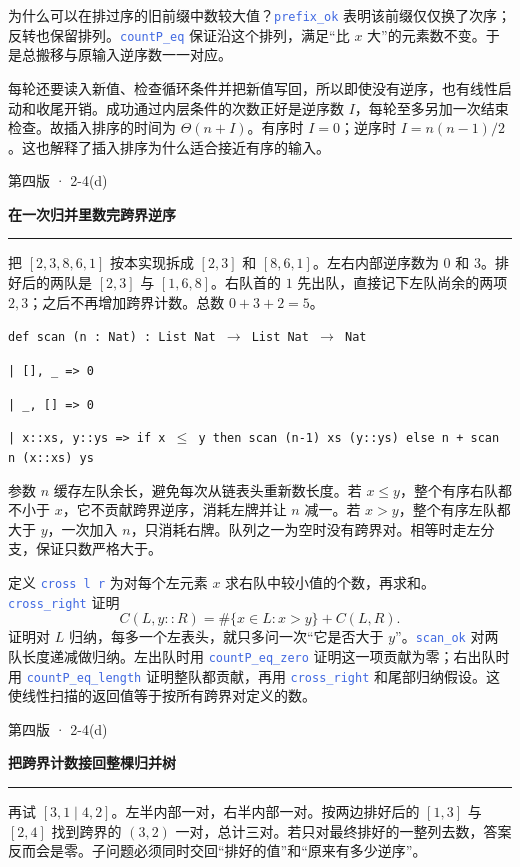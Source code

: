 \documentclass[UTF8,11pt,a4paper,fontset=fandol]{ctexart}
\newcommand{\HandoutLesson}[2]{%
  \par{\small\heiti\color{BrickRed}#1}\par\vspace{3pt}
  {\fontsize{21}{27}\selectfont\heiti\bfseries #2}\par
  \textcolor{BrickRed}{\rule{\linewidth}{.7pt}}\par}
\newcommand{\src}[1]{\textcolor{RoyalBlue}{\texttt{#1}}}
\newcommand{\subhead}[1]{\par\vspace{3pt}{\heiti\bfseries\color{RoyalBlue}#1}\par}
\newenvironment{leanblock}{\par\smallskip\noindent\begin{lrbox}{\leanbox}\begin{minipage}{\dimexpr\linewidth-12pt\relax}\raggedright\small\setlength{\parskip}{0pt}}{\end{minipage}\end{lrbox}\colorbox{RoyalBlue!6}{\usebox{\leanbox}}\par\smallskip}
\newcommand{\lineofcode}[2]{\noindent\hspace*{#1em}\strut\texttt{#2}\par}
\begin{document}
为什么可以在排过序的旧前缀中数较大值？\src{prefix\_ok} 表明该前缀仅仅换了次序；反转也保留排列。\src{countP\_eq} 保证沿这个排列，满足“比 $x$ 大”的元素数不变。于是总搬移与原输入逆序数一一对应。
\subhead{从精确搬移数得到运行时间}
每轮还要读入新值、检查循环条件并把新值写回，所以即使没有逆序，也有线性启动和收尾开销。成功通过内层条件的次数正好是逆序数 $I$，每轮至多另加一次结束检查。故插入排序的时间为 $\Theta(n+I)$。有序时 $I=0$；逆序时 $I=n(n-1)/2$。这也解释了插入排序为什么适合接近有序的输入。
\par{}
\clearpage{}\label{p49}\HandoutLesson{第四版 · 2-4(d)}{在一次归并里数完跨界逆序}
把 $[2,3,8,6,1]$ 按本实现拆成 $[2,3]$ 和 $[8,6,1]$。左右内部逆序数为 $0$ 和 $3$。排好后的两队是 $[2,3]$ 与 $[1,6,8]$。右队首的 $1$ 先出队，直接记下左队尚余的两项 $2,3$；之后不再增加跨界计数。总数 $0+3+2=5$。
\begin{leanblock}
\lineofcode{0.0}{def scan (n : Nat) : List Nat \ensuremath{\to} List Nat \ensuremath{\to} Nat}
\lineofcode{0.9}{| [], \_ => 0}
\lineofcode{0.9}{| \_, [] => 0}
\lineofcode{0.9}{| x::xs, y::ys => if x \ensuremath{\leq} y then scan (n-1) xs (y::ys) else n + scan n (x::xs) ys}
\end{leanblock}
参数 $n$ 缓存左队余长，避免每次从链表头重新数长度。若 $x\le y$，整个有序右队都不小于 $x$，它不贡献跨界逆序，消耗左牌并让 $n$ 减一。若 $x>y$，整个有序左队都大于 $y$，一次加入 $n$，只消耗右牌。队列之一为空时没有跨界对。相等时走左分支，保证只数严格大于。
\subhead{关键等式怎样交给 Lean}
定义 \src{cross l r} 为对每个左元素 $x$ 求右队中较小值的个数，再求和。\src{cross\_right} 证明
\[
 C(L,y::R)=\#\{x\in L:x>y\}+C(L,R).
\]
证明对 $L$ 归纳，每多一个左表头，就只多问一次“它是否大于 $y$”。\src{scan\_ok} 对两队长度递减做归纳。左出队时用 \src{countP\_eq\_zero} 证明这一项贡献为零；右出队时用 \src{countP\_eq\_length} 证明整队都贡献，再用 \src{cross\_right} 和尾部归纳假设。这使线性扫描的返回值等于按所有跨界对定义的数。
\par{}
\clearpage{}\label{p50}\HandoutLesson{第四版 · 2-4(d)}{把跨界计数接回整棵归并树}
再试 $[3,1\mid4,2]$。左半内部一对，右半内部一对。按两边排好后的 $[1,3]$ 与 $[2,4]$ 找到跨界的 $(3,2)$ 一对，总计三对。若只对最终排好的一整列去数，答案反而会是零。子问题必须同时交回“排好的值”和“原来有多少逆序”。
\end{document}
